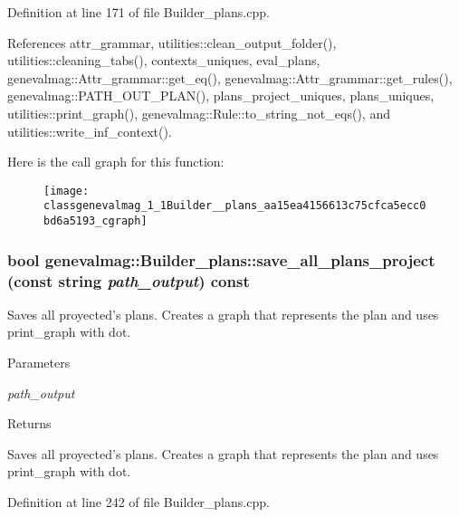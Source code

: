 Definition at line 171 of file Builder\_\-plans.cpp.



References attr\_\-grammar, utilities::clean\_\-output\_\-folder(), utilities::cleaning\_\-tabs(), contexts\_\-uniques, eval\_\-plans, genevalmag::Attr\_\-grammar::get\_\-eq(), genevalmag::Attr\_\-grammar::get\_\-rules(), genevalmag::PATH\_\-OUT\_\-PLAN(), plans\_\-project\_\-uniques, plans\_\-uniques, utilities::print\_\-graph(), genevalmag::Rule::to\_\-string\_\-not\_\-eqs(), and utilities::write\_\-inf\_\-context().



Here is the call graph for this function:\nopagebreak
\begin{figure}[H]
\begin{center}
\leavevmode
\texttt{[image: classgenevalmag\_1\_1Builder\_\_plans\_aa15ea4156613c75cfca5ecc0bd6a5193\_cgraph]}
\end{center}
\end{figure}


\hypertarget{classgenevalmag_1_1Builder__plans_a7017816e03c141df9dbdb55f3f8f896c}{
\subsubsection[{save\_\-all\_\-plans\_\-project}]{\setlength{\rightskip}{0pt plus 5cm}bool genevalmag::Builder\_\-plans::save\_\-all\_\-plans\_\-project (const string {\em path\_\-output}) const}}
\label{classgenevalmag_1_1Builder__plans_a7017816e03c141df9dbdb55f3f8f896c}
Saves all proyected's plans. Creates a graph that represents the plan and uses print\_\-graph with dot. 
\begin{DoxyParams}{Parameters}
\item[{\em path\_\-output}]\end{DoxyParams}
\begin{DoxyReturn}{Returns}

\end{DoxyReturn}
Saves all proyected's plans. Creates a graph that represents the plan and uses print\_\-graph with dot. 

Definition at line 242 of file Builder\_\-plans.cpp.



